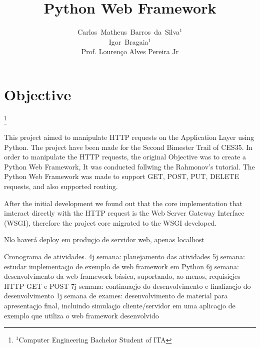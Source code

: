 \documentclass[journal,12pt,onecolumn,draftclsnofoot,]{IEEEtran}
\newcommand\blfootnote[1]{%
  \begingroup
  \renewcommand\thefootnote{}\footnote{#1}%
  \addtocounter{footnote}{-1}%
  \endgroup
}
\begin{document}
\title{Python Web Framework}
\author{Carlos~Matheus~Barros~da~Silva$^1$
\\
Igor~Bragaia$^1$
\\
Prof. Lourenço Alves Pereira Jr}
\maketitle

\IEEEpeerreviewmaketitle



\section{Objective}
\blfootnote{$^1$Computer Engineering Bachelor Student of ITA}

This project aimed to manipulate HTTP requests on the Application Layer using Python. The project have been made for the Second Bimester Trail of CES35. In order to manipulate the HTTP requests, the original Objective was to create a Python Web Framework, It was conducted follwing the Rahmonov's tutorial\cite{c1}\cite{c2}\cite{c3}. The Python Web Framework was made to support GET, POST, PUT, DELETE requests, and also supported routing.

After the initial development we found out that the core implementation that imteract directly with the HTTP request is the Web Server Gateway Interface (WSGI), therefore the project core migrated to the WSGI developed.

Nlo haverá deploy em produçjo de servidor web, apenas localhost

Cronograma de atividades.
4j semana: planejamento das atividades
5j semana: estudar implementaçjo de exemplo de web framework em Python
6j semana: desenvolvimento da web framework básica, suportando, ao menos, requisiçjes HTTP GET e POST
7j semana: continuaçjo do desenvolvimento e finalizaçjo do desenvolvimento
1j semana de exames: desenvolvimento de material para apresentaçjo final, incluindo simulaçjo cliente/servidor em uma aplicaçjo de exemplo que utiliza o web framework desenvolvido
\end{document}
